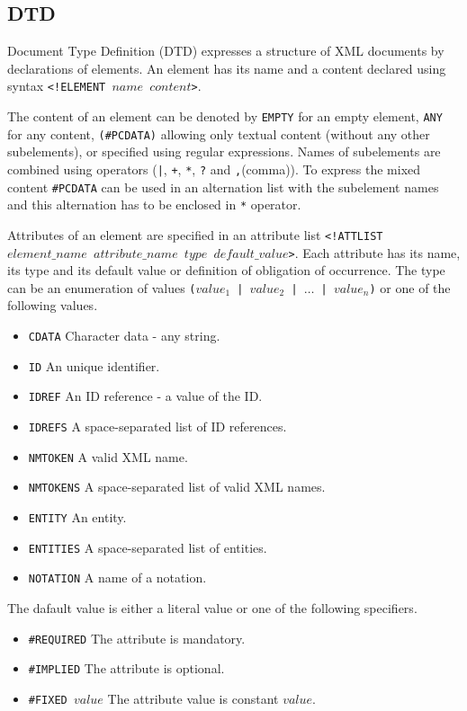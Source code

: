 \subsection{DTD}
Document Type Definition (DTD) expresses a structure of XML documents by declarations of elements. An element has its name and a content declared using syntax \texttt{<!ELEMENT $name$ $content$>}.

The content of an element can be denoted by \texttt{EMPTY} for an empty element, \texttt{ANY} for any content, \texttt{(\#PCDATA)} allowing only textual content (without any other subelements), or specified using regular expressions. Names of subelements are combined using operators (\texttt{|}, \texttt{+}, \texttt{*}, \texttt{?} and \texttt{,}(comma)). To express the mixed content \texttt{\#PCDATA} can be used in an alternation list with the subelement names and this alternation has to be enclosed in \texttt{*} operator.

Attributes of an element are specified in an attribute list \texttt{<!ATTLIST\linebreak $element\_name$ $attribute\_name$ $type$ $default\_value$>}. Each attribute has its name, its type and its default value or definition of obligation of occurrence. The type can be an enumeration of values \texttt{($value_1$ | $value_2$ | $\dots$ | $value_n$)} or one of the following values.

\begin{itemize}
\item \texttt{CDATA} Character data - any string.
\item \texttt{ID} An unique identifier.
\item \texttt{IDREF} An ID reference - a value of the ID.
\item \texttt{IDREFS} A space-separated list of ID references. 
\item \texttt{NMTOKEN}	A valid XML name.
\item \texttt{NMTOKENS} A space-separated list of valid XML names.
\item \texttt{ENTITY} An entity.
\item \texttt{ENTITIES} A space-separated list of entities.
\item \texttt{NOTATION} A name of a notation.
\end{itemize}

The dafault value is either a literal value or one of the following specifiers.

\begin{itemize}
\item \texttt{\#REQUIRED} The attribute is mandatory.
\item \texttt{\#IMPLIED} The attribute is optional.
\item \texttt{\#FIXED $value$} The attribute value is constant $value$.
\end{itemize}

